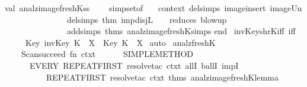 \begin{isabellebody}
  \isanewline
  val\ analz{\isacharunderscore}image{\isacharunderscore}freshK{\isacharunderscore}ss\ {\isacharequal}\ \isanewline
  \ \ simpset{\isacharunderscore}of\isanewline
  \ \ \ {\isacharparenleft}{\isacharat}{\isacharbraceleft}context{\isacharbraceright}\ delsimps\ {\isacharbrackleft}image{\isacharunderscore}insert{\isacharcomma}\ image{\isacharunderscore}Un{\isacharbrackright}\isanewline
  \ \ \ \ \ \ \ \ \ \ \ \ \ \ \ delsimps\ {\isacharbrackleft}{\isacharat}{\isacharbraceleft}thm\ imp{\isacharunderscore}disjL{\isacharbraceright}{\isacharbrackright}\ \ \ \ {\isacharparenleft}{\isacharasterisk}reduces\ blow{\isacharminus}up{\isacharasterisk}{\isacharparenright}\isanewline
  \ \ \ \ \ \ \ \ \ \ \ \ \ \ \ addsimps\ {\isacharat}{\isacharbraceleft}thms\ analz{\isacharunderscore}image{\isacharunderscore}freshK{\isacharunderscore}simps{\isacharbraceright}{\isacharparenright}\isanewline
  end\isanewline
  {\isacartoucheclose}%
  \endisatagML
  {\isafoldML}%
  \isadelimML
  \isanewline
  \endisadelimML
  \isanewline
  \isanewline
  \isamarkupfalse%
  \ invKey{\isacharunderscore}shrK{\isacharunderscore}iff\ {\isacharbrackleft}iff{\isacharbrackright}{\isacharcolon}\isanewline
  \ \ \ \ \ {\isachardoublequoteopen}{\isacharparenleft}Key\ {\isacharparenleft}invKey\ K{\isacharparenright}\ {\isasymin}\ X{\isacharparenright}\ {\isacharequal}\ {\isacharparenleft}Key\ K\ {\isasymin}\ X{\isacharparenright}{\isachardoublequoteclose}\isanewline
  \isadelimproof
  \endisadelimproof
  \isatagproof
  \isamarkupfalse%
  \ auto%
  \endisatagproof
  {\isafoldproof}%
  \isadelimproof
  \isanewline
  \endisadelimproof
  \isanewline
  \isadelimML
  \isanewline
  \endisadelimML
  \isatagML
  \isamarkupfalse%
  \ analz{\isacharunderscore}freshK\ {\isacharequal}\ {\isacartoucheopen}\isanewline
  \ \ \ \ Scan{\isachardot}succeed\ {\isacharparenleft}fn\ ctxt\ {\isacharequal}{\isachargreater}\isanewline
  \ \ \ \ \ {\isacharparenleft}SIMPLE{\isacharunderscore}METHOD\isanewline
  \ \ \ \ \ \ {\isacharparenleft}EVERY\ {\isacharbrackleft}REPEAT{\isacharunderscore}FIRST\ {\isacharparenleft}resolve{\isacharunderscore}tac\ ctxt\ {\isacharbrackleft}allI{\isacharcomma}\ ballI{\isacharcomma}\ impI{\isacharbrackright}{\isacharparenright}{\isacharcomma}\isanewline
  \ \ \ \ \ \ \ \ \ \ REPEAT{\isacharunderscore}FIRST\ {\isacharparenleft}resolve{\isacharunderscore}tac\ ctxt\ {\isacharat}{\isacharbraceleft}thms\ analz{\isacharunderscore}image{\isacharunderscore}freshK{\isacharunderscore}lemma{\isacharbraceright}{\isacharparenright}{\isacharcomma}\isanewline

\end{isabellebody}
